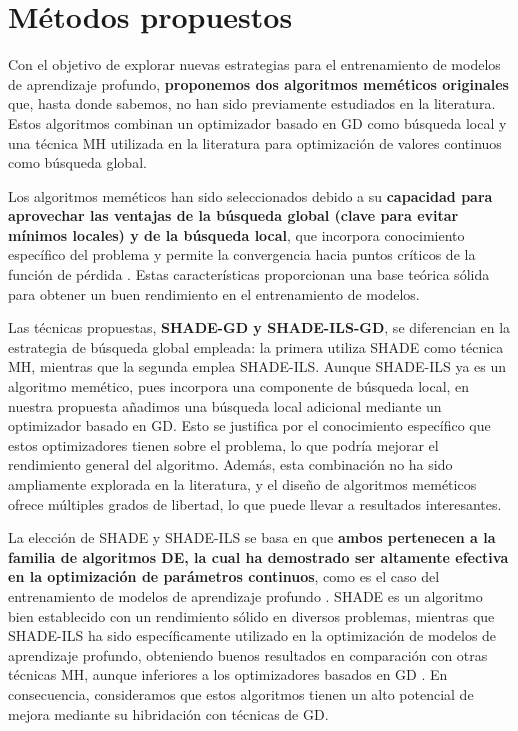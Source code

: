 \section{Métodos propuestos}\label{sec:propuestas}

Con el objetivo de explorar nuevas estrategias para el entrenamiento de modelos de aprendizaje profundo, \textbf{proponemos dos algoritmos meméticos originales} que, hasta donde sabemos, no han sido previamente estudiados en la literatura. Estos algoritmos combinan un optimizador basado en GD como búsqueda local y una técnica MH utilizada en la literatura para optimización de valores continuos como búsqueda global.

Los algoritmos meméticos han sido seleccionados debido a su \textbf{capacidad para aprovechar las ventajas de la búsqueda global (clave para evitar mínimos locales) y de la búsqueda local}, que incorpora conocimiento específico del problema y permite la convergencia hacia puntos críticos de la función de pérdida \cite{shadeils}. Estas características proporcionan una base teórica sólida para obtener un buen rendimiento en el entrenamiento de modelos.

Las técnicas propuestas, \textbf{SHADE-GD y SHADE-ILS-GD}, se diferencian en la estrategia de búsqueda global empleada: la primera utiliza SHADE como técnica MH, mientras que la segunda emplea SHADE-ILS. Aunque SHADE-ILS ya es un algoritmo memético, pues incorpora una componente de búsqueda local, en nuestra propuesta añadimos una búsqueda local adicional mediante un optimizador basado en GD. Esto se justifica por el conocimiento específico que estos optimizadores tienen sobre el problema, lo que podría mejorar el rendimiento general del algoritmo. Además, esta combinación no ha sido ampliamente explorada en la literatura, y el diseño de algoritmos meméticos ofrece múltiples grados de libertad, lo que puede llevar a resultados interesantes.

La elección de SHADE y SHADE-ILS se basa en que \textbf{ambos pertenecen a la familia de algoritmos DE, la cual ha demostrado ser altamente efectiva en la optimización de parámetros continuos}, como es el caso del entrenamiento de modelos de aprendizaje profundo \cite{shade}. SHADE es un algoritmo bien establecido con un rendimiento sólido en diversos problemas, mientras que SHADE-ILS ha sido específicamente utilizado en la optimización de modelos de aprendizaje profundo, obteniendo buenos resultados en comparación con otras técnicas MH, aunque inferiores a los optimizadores basados en GD \cite{shadeils}. En consecuencia, consideramos que estos algoritmos tienen un alto potencial de mejora mediante su hibridación con técnicas de GD.

